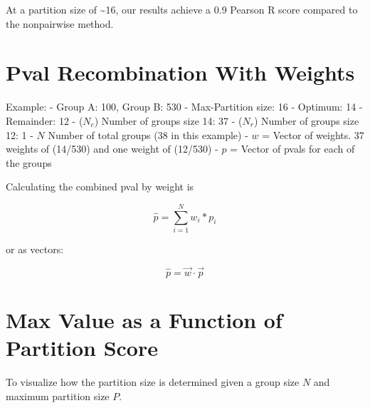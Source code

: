 \documentclass{article}
\begin{document}
    At a partition size of \textasciitilde{}16, our results achieve a 0.9
Pearson R score compared to the nonpairwise method.

    \section{Pval Recombination With
Weights}\label{pval-recombination-with-weights}

Example: - Group A: 100, Group B: 530 - Max-Partition size: 16 -
Optimum: 14 - Remainder: 12 - (\(N_c\)) Number of groups size 14: 37 -
(\(N_r\)) Number of groups size 12: 1 - \(N\) Number of total groups (38
in this example) - \(w\) = Vector of weights. 37 weights of (14/530) and
one weight of (12/530) - \(p\) = Vector of pvals for each of the groups

Calculating the combined pval by weight is

\[ \hat{p} = \sum_{i=1}^{N} w_i * p_i \]

or as vectors:

\[ \hat{p} = \vec{w} \cdot \vec{p} \]

    \section{Max Value as a Function of Partition
Score}\label{max-value-as-a-function-of-partition-score}

To visualize how the partition size is determined given a group size
\(N\) and maximum partition size \(P\).
\end{document}
